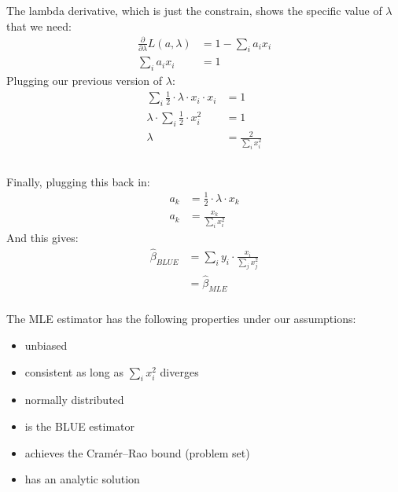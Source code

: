 \begin{frame}[fragile] \frametitle{}

The lambda derivative, which is just the constrain, shows the specific
value of $\lambda$ that we need:
\begin{align*}
\frac{\partial}{\partial \lambda}  L(a,\lambda) &= 1 - \sum_i a_i x_i \\
\sum_i a_i x_i &= 1
\end{align*}
\pause Plugging our previous version of $\lambda$:
\begin{align*}
\sum_i \frac{1}{2} \cdot \lambda \cdot x_i \cdot x_i &= 1 \\
\lambda \cdot \sum_i \frac{1}{2} \cdot x_i^2 &= 1 \\
\lambda &= \frac{2}{\sum_i x_i^2} \\
\end{align*}

\end{frame}

\begin{frame}[fragile] \frametitle{}

Finally, plugging this back in:
\begin{align*}
a_k &= \frac{1}{2} \cdot \lambda \cdot x_k \\
a_k &= \frac{x_k}{\sum_i x_i^2}
\end{align*}
And this gives:
\begin{align*}
\widehat{\beta}_{BLUE} &= \sum_i y_i \cdot \frac{x_i}{\sum_j x_j^2} \\
&= \widehat{\beta}_{MLE}
\end{align*}

\end{frame}

\begin{frame}[fragile] \frametitle{}

The MLE estimator has the following properties under our
assumptions:
\begin{itemize}
\item unbiased \pause
\item consistent as long as $\sum_i x_i^2$ diverges \pause
\item normally distributed \pause
\item is the BLUE estimator \pause
\item achieves the Cramér–Rao bound (problem set) \pause
\item has an analytic solution
\end{itemize}

\end{frame}


